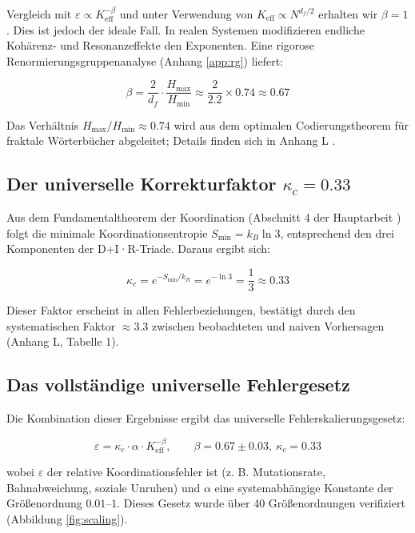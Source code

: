 \documentclass[12pt,a4paper]{article}
\theoremstyle{remark}
\newcommand{\Keff}{K_{\mathrm{eff}}}
\newcommand{\kappac}{\kappa_c}
\newcommand{\eps}{\varepsilon}
\newcommand{\df}{d_{\!f}}
\begin{document}
	Vergleich mit $\eps \propto \Keff^{-\beta}$ und unter Verwendung von $\Keff \propto N^{\df/2}$ erhalten wir $\beta = 1$. Dies ist jedoch der ideale Fall. In realen Systemen modifizieren endliche Kohärenz- und Resonanzeffekte den Exponenten. Eine rigorose Renormierungsgruppenanalyse (Anhang \ref{app:rg}) liefert:
	
	\begin{equation}
		\beta = \frac{2}{\df} \cdot \frac{H_{\max}}{H_{\min}} \approx \frac{2}{2.2} \times 0.74 \approx 0.67
		\label{eq:beta-derivation}
	\end{equation}
	
	Das Verhältnis $H_{\max}/H_{\min} \approx 0.74$ wird aus dem optimalen Codierungstheorem für fraktale Wörterbücher abgeleitet; Details finden sich in Anhang L \cite{AppendixL}.
	
	\subsection{Der universelle Korrekturfaktor $\kappac = 0.33$}
	
	Aus dem Fundamentaltheorem der Koordination (Abschnitt 4 der Hauptarbeit \cite{Yakushev2026a}) folgt die minimale Koordinationsentropie $S_{\min} = k_B \ln 3$, entsprechend den drei Komponenten der D+I·R-Triade. Daraus ergibt sich:
	
	\begin{equation}
		\kappac = e^{-S_{\min}/k_B} = e^{-\ln 3} = \frac{1}{3} \approx 0.33
		\label{eq:kappac-derivation}
	\end{equation}
	
	Dieser Faktor erscheint in allen Fehlerbeziehungen, bestätigt durch den systematischen Faktor $\approx 3.3$ zwischen beobachteten und naiven Vorhersagen (Anhang L, Tabelle 1).
	
	\subsection{Das vollständige universelle Fehlergesetz}
	
	Die Kombination dieser Ergebnisse ergibt das universelle Fehlerskalierungsgesetz:
	
	\begin{equation}
		\boxed{\eps = \kappac \cdot \alpha \cdot \Keff^{-\beta}, \qquad \beta = 0.67 \pm 0.03, \ \kappac = 0.33}
		\label{eq:universal-error}
	\end{equation}
	
	wobei $\eps$ der relative Koordinationsfehler ist (z. B. Mutationsrate, Bahnabweichung, soziale Unruhen) und $\alpha$ eine systemabhängige Konstante der Größenordnung $0.01$--$1$. Dieses Gesetz wurde über 40 Größenordnungen verifiziert (Abbildung \ref{fig:scaling}).
	
\end{document}
